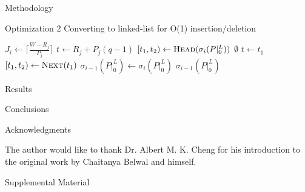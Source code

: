 \documentclass{article}
\begin{document}
\begin{section}{Methodology}
  \begin{subsection}{Optimization 2}
    Converting to linked-list for O(1) insertion/deletion
    \begin{algorithm}[H]
      \caption{Gap-Tranformation Algorithm Optimization 2: No Zero Gaps Reinserted, Linked List}\label{gapxfrm2}
      \begin{algorithmic}[2]
          \State $J_{i} \gets \lceil\frac{W - R_{j}}{P_{j}}\rceil$
            \State $t \gets R_{j} + P_{j}(q-1)$
            \State $[t_{1},t_{2}) \gets \Call{Head}{\sigma_{i}(P|_{0}^{L})}$
            \While{$[t_{1},t_{2}) \not= \Call{Tail}{\sigma_{i}(P|_{0}^{L})}$}
                \State \Return $\emptyset$
              \EndIf
                \State $t \gets t_{1}$
              \EndIf
                    \State {$[t_{1},t_{2}) \gets [t_{1},t)$}
                  \Else
                    \State {\Call{Splice-Out}{$\sigma_{i}(P|_{0}^{L}), [t_{1},t_{2})$}}
                  \EndIf
                    \ExitWhile
                  \EndIf
                \EndIf
                    \State {$[t_{1},t_{2}) \gets [t + C_{j},t_{2})$}
                      \State \Call{Splice-In}{$\sigma_{i}(P|_{0}^{L}), [t_{1},t)$}
                    \EndIf
                  \ExitWhile
                \EndIf
              \EndIf
              \State $[t_{1},t_{2}) \gets \Call{Next}{t_{1}}$
            \EndWhile
          \EndFor
          \State $\sigma_{i-1}(P|_{0}^{L}) \gets \sigma_{i}(P|_{0}^{L})$
          \State \Return $\sigma_{i-1}(P|_{0}^{L})$
        \EndFunction
      \end{algorithmic}
      \end{algorithm}
  \end{subsection}

\end{section}

\begin{section}{Results}
\end{section}

\begin{section}{Conclusions}
\end{section}

\begin{section}{Acknowledgments}
  \begin{paragraph}{}
    The author would like to thank Dr. Albert M. K. Cheng for his introduction to the original work by Chaitanya Belwal and himself.
  \end{paragraph}
\end{section}

\printbibliography

\begin{section}{Supplemental Material}
\end{section}
\end{document}
